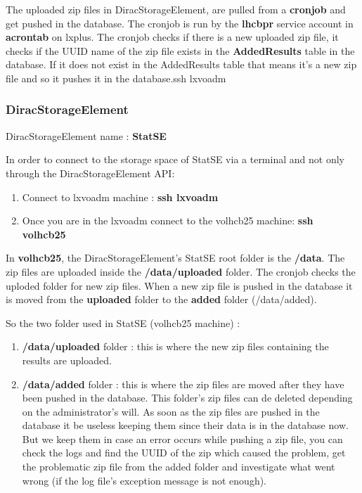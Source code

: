 \documentclass{lhcbnote}
\begin{document}
The uploaded zip files in DiracStorageElement, are pulled from a {\bf cronjob} and get pushed in the database. The cronjob is run by the {\bf lhcbpr} service account 
in {\bf acrontab} on lxplus. The cronjob checks if there is a new uploaded zip file, it checks if the UUID name of the zip file exists in the {\bf AddedResults} table in the database. If it does not exist 
in the AddedResults table that means it's a new zip file and so it pushes it in the database.ssh lxvoadm  

\subsubsection {DiracStorageElement}

DiracStorageElement name : { \bf StatSE}

In order to connect to the storage space of StatSE via a terminal and not only through the DiracStorageElement API:

\begin {enumerate}
\item
Connect to lxvoadm machine :  {\bf ssh lxvoadm}
\item
Once you are in the lxvoadm connect to the volhcb25 machine: {\bf ssh volhcb25}
\end {enumerate}

In {\bf volhcb25}, the DiracStorageElement's StatSE root folder is the {\bf /data}. The zip files are uploaded inside the {\bf /data/uploaded} folder. 
The cronjob checks the uploded folder for new zip files. When a new zip file is pushed in the database it is moved from the {\bf uploaded } folder to the {\bf added} folder (/data/added).

So the two folder used in StatSE (volhcb25 machine) :

\begin {enumerate}
\item
{\bf /data/uploaded} folder   : this is where the new zip files containing the results are uploaded.
\item
{\bf /data/added} folder : this is where the zip files are moved after they have been pushed in the database. This folder's zip files can de deleted depending on the administrator's will. 
As soon as the zip files are pushed in the database it be useless keeping them since their data is in the database now. But we keep them in case an error occurs while pushing a zip file, 
you can check the logs and find the UUID of the zip which caused the problem, 
get the problematic zip file from the added folder and investigate what went wrong (if the log file's exception message is not enough).
\end {enumerate}
\end{document}
